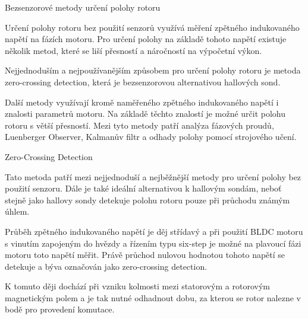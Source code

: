 \sec Bezsenzorové metody určení polohy rotoru


Určení polohy rotoru bez použití senzorů využívá měření zpětného indukovaného napětí na fázích motoru.
Pro určení polohy na základě tohoto napětí existuje několik metod, které se liší přesností a náročností na výpočetní výkon.

Nejjednoduším a nejpoužívanějším způsobem pro určení polohy rotoru je metoda zero-crossing detection, která je 
bezsenzorovou alternativou hallových sond.

Další metody využívají kromě naměřeného zpětného indukovaného napětí i znalosti parametrů motoru. Na základě těchto znalostí je možné 
určit polohu rotoru s větší přesností. Mezi tyto metody patří analýza fázových proudů, Luenberger Observer, Kalmanův filtr a odhady polohy
pomocí strojového učení. 


\secc Zero-Crossing Detection %

Tato metoda patří mezi nejjednoduší a nejběžnější metody pro určení polohy bez použití senzoru. Dále je také ideální 
alternativou k hallovým sondám, neboť stejně jako hallovy sondy detekuje polohu rotoru pouze při průchodu známým úhlem. 

Průběh zpětného indukovaného napětí je děj střídavý a při použití BLDC motoru s vinutím zapojeným do hvězdy a řízením typu six-step 
je možné na plavoucí fázi motoru toto napětí měřit. Právě průchod nulovou hodnotou tohoto napětí se detekuje a býva 
označován jako zero-crossing detection. 

K tomuto ději dochází při vzniku kolmosti mezi statorovým a rotorovým magnetickým polem a je tak nutné odhadnout dobu, za kterou se rotor
nalezne v bodě pro provedení komutace.

